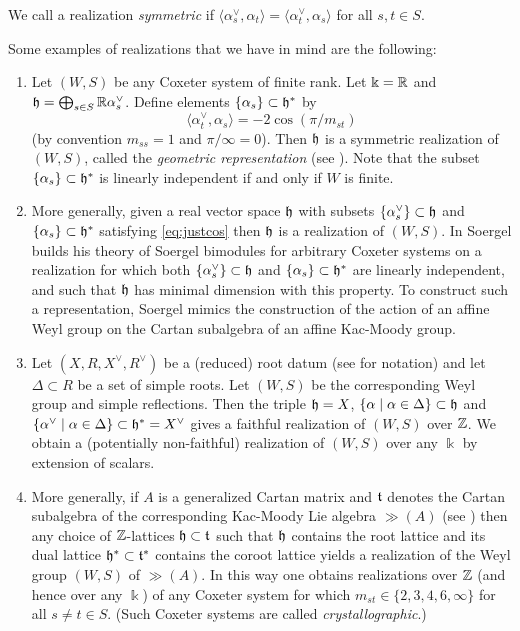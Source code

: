 We call a realization \emph{symmetric} if $\langle \alpha_s^\vee, \alpha_t \rangle = \langle \alpha_t^\vee, \alpha_s \rangle$ for all $s, t \in S$.

\begin{ex} \label{ex:realizations} Some examples of realizations that we have in mind are the following:
  \begin{enumerate}
  \item Let $(W,S)$ be any Coxeter system of finite rank. Let $\Bbbk = {\mathbb{R}}$ and ${\mathfrak h} = \bigoplus_{s \in S} {\mathbb{R}} \alpha_s^{\vee}$. Define elements $\{ \alpha_s \} \subset {\mathfrak h}^*$ by
\begin{equation} \label{eq:justcos}
\langle \alpha_t^\vee, \alpha_s \rangle = -2\cos(\pi/m_{st})
\end{equation}
(by convention $m_{ss} =1$ and $\pi/\infty = 0$). Then ${\mathfrak h}$ is a symmetric realization of $(W,S)$, called the \emph{geometric representation} (see \cite[\S 5.3]{Humphreys}). Note that the subset $\{ \alpha_s \} \subset  {\mathfrak h}^*$ is linearly independent if and only if $W$ is finite.

\item
More generally, given a real vector space ${\mathfrak h}$ with subsets $\{ \alpha_s^{\vee} \} \subset {\mathfrak h}$ and $\{ \alpha_s \} \subset {\mathfrak h}^*$ satisfying \eqref{eq:justcos} then ${\mathfrak h}$ is a realization of $(W,S)$. In  \cite[\S 2]{Soe3} Soergel builds his theory of Soergel bimodules for arbitrary Coxeter systems on a realization for which both $\{ \alpha_s^{\vee} \} \subset {\mathfrak h}$ and $\{ \alpha_s \} \subset {\mathfrak h}^*$ are linearly independent, and such that ${\mathfrak h}$ has minimal dimension with this property. To construct such a representation, Soergel mimics the construction of the action of an affine Weyl group on the Cartan subalgebra of an affine Kac-Moody group.

\item Let $(X, R, X^\vee, R^\vee)$ be a (reduced) root datum (see \cite[\S 7.4]{SprLAG} for notation) and let $\Delta \subset R$ be a set of simple roots. Let $(W,S)$ be the corresponding Weyl group and simple reflections. Then the triple ${\mathfrak h} = X$, $\{\alpha \; | \; \alpha \in \Delta \} \subset {\mathfrak h}$ and $\{\alpha^\vee \; | \; \alpha \in \Delta \} \subset {\mathfrak h}^* = X^\vee$ gives a faithful realization of $(W,S)$ over ${\mathbb{Z}}$. We obtain a (potentially non-faithful) realization of $(W,S)$ over any $\Bbbk$ by extension of scalars.

\item
More generally, if $A$ is a generalized Cartan matrix and ${\mathfrak t}$ denotes the Cartan subalgebra of the corresponding Kac-Moody Lie algebra $\gg(A)$ (see \cite[Chapters 1 and 3]{KacBook}) then any choice of ${\mathbb{Z}}$-lattices ${\mathfrak h} \subset {\mathfrak t}$ such that ${\mathfrak h}$ contains the root lattice and its dual lattice ${\mathfrak h}^* \subset {\mathfrak t}^*$ contains the coroot lattice yields a realization of the Weyl group $(W,S)$ of $\gg(A)$. In this way one obtains realizations over ${\mathbb{Z}}$ (and hence over any $\Bbbk$) of any Coxeter system for which $m_{st} \in \{ 2,3,4,6, \infty\}$ for all $s \ne t \in S$. (Such Coxeter systems are called \emph{crystallographic}.)


\end{enumerate}
\end{ex}

